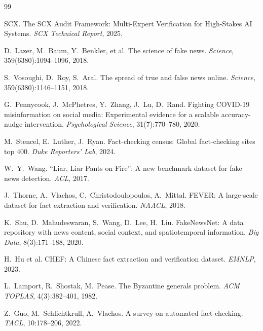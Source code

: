 \documentclass[11pt,a4paper]{article}
\theoremstyle{definition}
\begin{document}
\begin{thebibliography}{99}

SCX.
\newblock The SCX Audit Framework: Multi-Expert Verification for High-Stakes AI Systems.
\newblock \textit{SCX Technical Report}, 2025.

D.~Lazer, M.~Baum, Y.~Benkler, et al.
\newblock The science of fake news.
\newblock \textit{Science}, 359(6380):1094--1096, 2018.

S.~Vosoughi, D.~Roy, S.~Aral.
\newblock The spread of true and false news online.
\newblock \textit{Science}, 359(6380):1146--1151, 2018.

G.~Pennycook, J.~McPhetres, Y.~Zhang, J.~Lu, D.~Rand.
\newblock Fighting COVID-19 misinformation on social media: Experimental evidence for a scalable accuracy-nudge intervention.
\newblock \textit{Psychological Science}, 31(7):770--780, 2020.

M.~Stencel, E.~Luther, J.~Ryan.
\newblock Fact-checking census: Global fact-checking sites top 400.
\newblock \textit{Duke Reporters' Lab}, 2024.

W.~Y.~Wang.
\newblock ``Liar, Liar Pants on Fire'': A new benchmark dataset for fake news detection.
\newblock \textit{ACL}, 2017.

J.~Thorne, A.~Vlachos, C.~Christodoulopoulos, A.~Mittal.
\newblock FEVER: A large-scale dataset for fact extraction and verification.
\newblock \textit{NAACL}, 2018.

K.~Shu, D.~Mahudeswaran, S.~Wang, D.~Lee, H.~Liu.
\newblock FakeNewsNet: A data repository with news content, social context, and spatiotemporal information.
\newblock \textit{Big Data}, 8(3):171--188, 2020.

H.~Hu et al.
\newblock CHEF: A Chinese fact extraction and verification dataset.
\newblock \textit{EMNLP}, 2023.

L.~Lamport, R.~Shostak, M.~Pease.
\newblock The Byzantine generals problem.
\newblock \textit{ACM TOPLAS}, 4(3):382--401, 1982.

Z.~Guo, M.~Schlichtkrull, A.~Vlachos.
\newblock A survey on automated fact-checking.
\newblock \textit{TACL}, 10:178--206, 2022.


\end{thebibliography}
\end{document}
